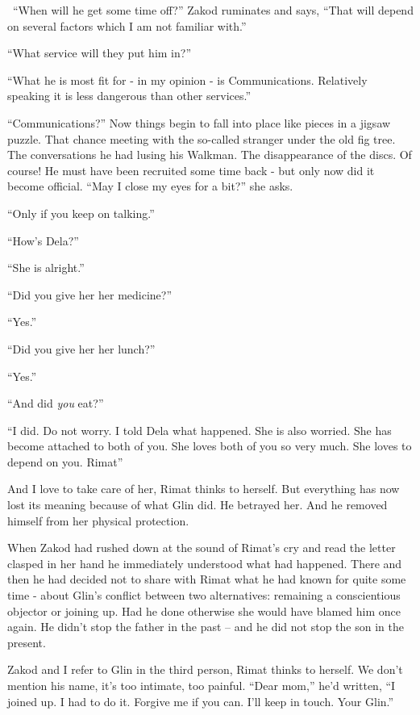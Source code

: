 \documentclass[twoside,11pt]{book}
\begin{document}
\ ``When will he get some time off?'' Zakod ruminates and says, ``That will depend on several factors
which I am not familiar with.'' \

``What service will they put him in?''

``What he is most fit for - in my opinion - is Communications. Relatively speaking it is less dangerous than other
services.''

``Communications?'' Now things begin to fall into place like pieces in a jigsaw puzzle. That chance meeting with the
so-called stranger under the old fig tree. The conversations he had lusing his Walkman. The disappearance of the discs.
Of course! He must have been recruited some time back - but only now did it become official. ``May I close my eyes
for a bit?'' she asks.

``Only if you keep on talking.''

``How's Dela?''

``She is alright.''

``Did you give her her medicine?''

``Yes.''

``Did you give her her lunch?''

``Yes.''

``And did \textit{you} eat?''

``I did. Do not worry. I told Dela what happened. She is also worried.  She has become attached to both of you. She
loves both of you so very much. She loves to depend on you. Rimat''

And I love to take care of her, Rimat thinks to herself. But everything has now lost its meaning because of what Glin
did. He betrayed her. And he removed himself from her physical protection.

When Zakod had rushed down at the sound of Rimat's cry and read the letter clasped in her hand he
immediately understood what had happened. There and then he had decided not to share with Rimat what
he had known for quite some time - about Glin's conflict between two alternatives:  remaining a conscientious objector
or joining up. Had he done otherwise she would have blamed him once again. He didn't stop the father in the past -- and
he did not stop the son in the present.

Zakod and I refer to Glin in the third person, Rimat thinks to herself. We don't mention his name, it's too
intimate, too painful. ``Dear mom,'' he'd written, ``I joined up. I had to do it. Forgive me if you
can. I'll keep in touch. Your Glin.''
\end{document}

